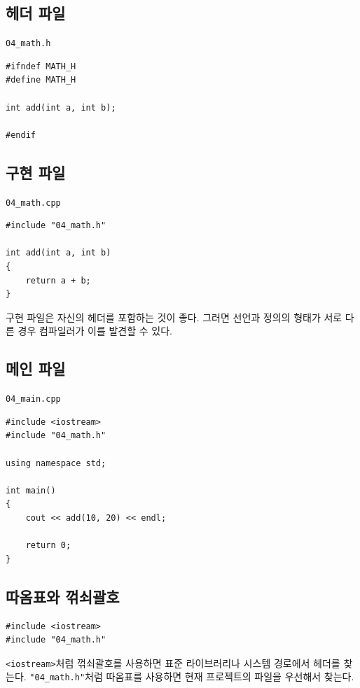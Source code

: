 \documentclass[11pt,a4paper]{article}
\begin{document}
\subsection{헤더 파일}

\texttt{04\_math.h}

\begin{lstlisting}
#ifndef MATH_H
#define MATH_H

int add(int a, int b);

#endif
\end{lstlisting}

\subsection{구현 파일}

\texttt{04\_math.cpp}

\begin{lstlisting}
#include "04_math.h"

int add(int a, int b)
{
    return a + b;
}
\end{lstlisting}

구현 파일은 자신의 헤더를 포함하는 것이 좋다.
그러면 선언과 정의의 형태가 서로 다른 경우 컴파일러가 이를 발견할 수 있다.

\subsection{메인 파일}

\texttt{04\_main.cpp}

\begin{lstlisting}
#include <iostream>
#include "04_math.h"

using namespace std;

int main()
{
    cout << add(10, 20) << endl;

    return 0;
}
\end{lstlisting}

\subsection{따옴표와 꺾쇠괄호}

\begin{lstlisting}
#include <iostream>
#include "04_math.h"
\end{lstlisting}

\texttt{<iostream>}처럼 꺾쇠괄호를 사용하면 표준 라이브러리나 시스템 경로에서 헤더를 찾는다.
\texttt{"04\_math.h"}처럼 따옴표를 사용하면 현재 프로젝트의 파일을 우선해서 찾는다.
\end{document}
